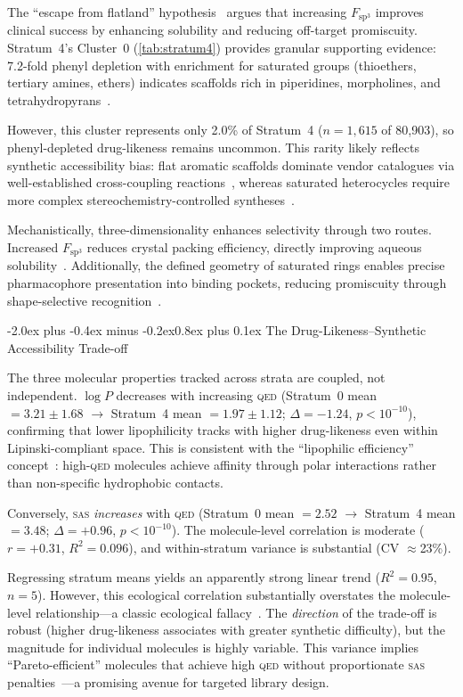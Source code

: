 \documentclass[10pt,a4paper,twocolumn]{article}
\makeatletter
\providecommand{\qed}{}
\let\qed\relax
\newcommand{\qedscore}{\textsc{qed}}
\let\qed\qedscore
\newcommand{\sas}{\textsc{sas}}
\newcommand{\fspthree}{\ensuremath{F_{\mathrm{sp}^3}}}
\newcommand{\logp}{\ensuremath{\log P}}
\renewcommand\subsection{\@startsection{subsection}{2}{\z@}%
  {-2.0ex plus -0.4ex minus -0.2ex}{0.8ex plus 0.1ex}%
  {\normalfont\large\bfseries}}
\makeatother
\begin{document}
The ``escape from flatland'' hypothesis~\cite{lovering2009} argues that increasing \fspthree{} improves clinical success by enhancing solubility and reducing off-target promiscuity. Stratum~4's Cluster~0 (\cref{tab:stratum4}) provides granular supporting evidence: 7.2-fold phenyl depletion with enrichment for saturated groups (thioethers, tertiary amines, ethers) indicates scaffolds rich in piperidines, morpholines, and tetrahydropyrans~\cite{clemons2010}.

However, this cluster represents only 2.0\% of Stratum~4 ($n = 1{,}615$ of 80,903), so phenyl-depleted drug-likeness remains uncommon. This rarity likely reflects synthetic accessibility bias: flat aromatic scaffolds dominate vendor catalogues via well-established cross-coupling reactions~\cite{brown2016}, whereas saturated heterocycles require more complex stereochemistry-controlled syntheses~\cite{roughley2011}.

Mechanistically, three-dimensionality enhances selectivity through two routes. Increased \fspthree{} reduces crystal packing efficiency, directly improving aqueous solubility~\cite{wei2020}. Additionally, the defined geometry of saturated rings enables precise pharmacophore presentation into binding pockets, reducing promiscuity through shape-selective recognition~\cite{meanwell2018}.

\subsection{The Drug-Likeness--Synthetic Accessibility Trade-off}

The three molecular properties tracked across strata are coupled, not independent. $\logp{}$ decreases with increasing \qed{} (Stratum~0 mean $= 3.21 \pm 1.68$ $\to$ Stratum~4 mean $= 1.97 \pm 1.12$; $\Delta = -1.24$, $p < 10^{-10}$), confirming that lower lipophilicity tracks with higher drug-likeness even within Lipinski-compliant space. This is consistent with the ``lipophilic efficiency'' concept~\cite{leeson2007}: high-\qed{} molecules achieve affinity through polar interactions rather than non-specific hydrophobic contacts.

Conversely, \sas{} \emph{increases} with \qed{} (Stratum~0 mean $= 2.52$ $\to$ Stratum~4 mean $= 3.48$; $\Delta = +0.96$, $p < 10^{-10}$). The molecule-level correlation is moderate ($r = +0.31$, $R^2 = 0.096$), and within-stratum variance is substantial (CV $\approx$23\%).

Regressing stratum means yields an apparently strong linear trend ($R^2 = 0.95$, $n=5$). However, this ecological correlation substantially overstates the molecule-level relationship---a classic ecological fallacy~\cite{robinson1950}. The \emph{direction} of the trade-off is robust (higher drug-likeness associates with greater synthetic difficulty), but the magnitude for individual molecules is highly variable. This variance implies ``Pareto-efficient'' molecules that achieve high \qed{} without proportionate \sas{} penalties~\cite{jin2020}---a promising avenue for targeted library design.
\end{document}
